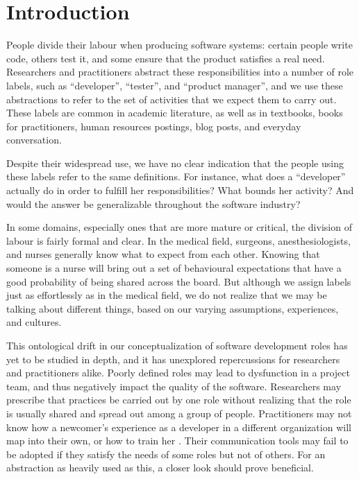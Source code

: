 \documentclass[10pt, conference, compsocconf]{IEEEtran}
\begin{document}
\section{Introduction}

People divide their labour when producing software systems: certain people write code, others test it, and some ensure that the product satisfies a real need. Researchers and practitioners abstract these responsibilities into a number of role labels, such as ``developer'', ``tester'', and ``product manager'', and we use these abstractions to refer to the set of activities that we expect them to carry out. These labels are common in academic literature, as well as in textbooks, books for practitioners, human resources postings, blog posts, and everyday conversation.

Despite their widespread use, we have no clear indication that the people using these labels refer to the same definitions. For instance, what does a ``developer'' actually do in order to fulfill her responsibilities? What bounds her activity? And would the answer be generalizable throughout the software industry?

In some domains, especially ones that are more mature or critical, the division of labour is fairly formal and clear. In the medical field, surgeons, anesthesiologists, and nurses generally know what to expect from each other. Knowing that someone is a nurse will bring out a set of behavioural expectations that have a good probability of being shared across the board. But although we assign labels just as effortlessly as in the medical field, we do not realize that we may be talking about different things, based on our varying assumptions, experiences, and cultures.

This ontological drift \cite{Robinson1991} in our conceptualization of software development roles has yet to be studied in depth, and it has unexplored repercussions for researchers and practitioners alike. Poorly defined roles may lead to dysfunction in a project team, and thus negatively impact the quality of the software. Researchers may prescribe that practices be carried out by one role without realizing that the role is usually shared and spread out among a group of people. Practitioners may not know how a newcomer's experience as a developer in a different organization will map into their own, or how to train her \cite{Dagenais2010}. Their communication tools may fail to be adopted if they satisfy the needs of some roles but not of others. For an abstraction as heavily used as this, a closer look should prove beneficial.
\end{document}
